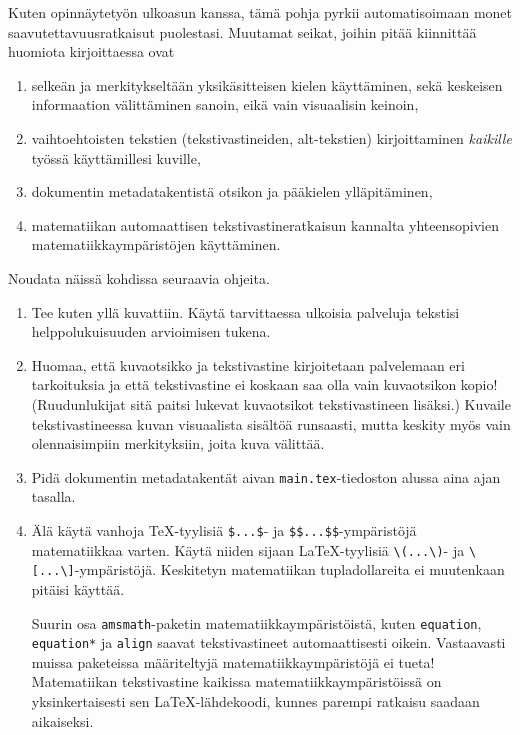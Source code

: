 Kuten opinnäytetyön ulkoasun kanssa, tämä pohja pyrkii automatisoimaan monet saavutettavuusratkaisut puolestasi. Muutamat seikat, joihin pitää kiinnittää huomiota kirjoittaessa ovat
\begin{enumerate}
\item selkeän ja merkitykseltään yksikäsitteisen kielen käyttäminen, sekä keskeisen informaation välittäminen sanoin, eikä vain visuaalisin keinoin,
\item vaihtoehtoisten tekstien (tekstivastineiden, alt-tekstien) kirjoittaminen \emph{kaikille} työssä käyttämillesi kuville,
\item dokumentin metadatakentistä otsikon ja pääkielen ylläpitäminen,
\item matematiikan automaattisen tekstivastineratkaisun kannalta yhteensopivien matematiikkaympäristöjen käyttäminen.
\end{enumerate}
Noudata näissä kohdissa seuraavia ohjeita.
\begin{enumerate}
\item Tee kuten yllä kuvattiin. Käytä tarvittaessa ulkoisia palveluja tekstisi helppolukuisuuden arvioimisen tukena.
\item Huomaa, että kuvaotsikko ja tekstivastine kirjoitetaan palvelemaan eri tarkoituksia ja että tekstivastine ei koskaan saa olla vain kuvaotsikon kopio! (Ruudunlukijat sitä paitsi lukevat kuvaotsikot tekstivastineen lisäksi.) Kuvaile tekstivastineessa kuvan visuaalista sisältöä runsaasti, mutta keskity myös vain olennaisimpiin merkityksiin, joita kuva välittää.
\item Pidä dokumentin metadatakentät aivan \texttt{main.tex}-tiedoston alussa aina ajan tasalla.
\item Älä käytä vanhoja \TeX{}-tyylisiä \verb+$...$+- ja \verb+$$...$$+-ympäristöjä matematiikkaa varten. Käytä niiden sijaan \LaTeX{}-tyylisiä \verb+\(...\)+- ja \verb+\[...\]+-ympäristöjä. Keskitetyn matematiikan tupladollareita ei muutenkaan pitäisi käyttää.

Suurin osa \texttt{amsmath}-paketin matematiikkaympäristöistä, kuten \texttt{equation}, \texttt{equation*} ja \texttt{align} saavat tekstivastineet automaattisesti oikein. Vastaavasti muissa paketeissa määriteltyjä matematiikkaympäristöjä ei tueta! Matematiikan tekstivastine kaikissa matematiikkaympäristöissä on yksinkertaisesti sen \LaTeX{}-lähdekoodi, kunnes parempi ratkaisu saadaan aikaiseksi.
\end{enumerate}
